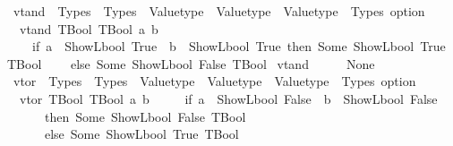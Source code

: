 \begin{isabellebody}
\isanewline
\isanewline
{}\isamarkupfalse%
\ vtand\ {\isacharcolon}{\kern0pt}{\isacharcolon}{\kern0pt}\ {\isachardoublequoteopen}Types\ {\isasymRightarrow}\ Types\ {\isasymRightarrow}\ Valuetype\ {\isasymRightarrow}\ Valuetype\ {\isasymRightarrow}\ {\isacharparenleft}{\kern0pt}Valuetype\ {\isacharasterisk}{\kern0pt}\ Types{\isacharparenright}{\kern0pt}\ option{\isachardoublequoteclose}\isanewline
{}\isanewline
\ \ {\isachardoublequoteopen}vtand\ TBool\ TBool\ a\ b\ {\isacharequal}{\kern0pt}\isanewline
\ \ \ \ {\isacharparenleft}{\kern0pt}if\ a\ {\isacharequal}{\kern0pt}\ ShowL\isactrlsub b\isactrlsub o\isactrlsub o\isactrlsub l\ True\ {\isasymand}\ b\ {\isacharequal}{\kern0pt}\ ShowL\isactrlsub b\isactrlsub o\isactrlsub o\isactrlsub l\ True\ then\ Some\ {\isacharparenleft}{\kern0pt}ShowL\isactrlsub b\isactrlsub o\isactrlsub o\isactrlsub l\ True{\isacharcomma}{\kern0pt}\ TBool{\isacharparenright}{\kern0pt}\isanewline
\ \ \ \ else\ Some\ {\isacharparenleft}{\kern0pt}ShowL\isactrlsub b\isactrlsub o\isactrlsub o\isactrlsub l\ False{\isacharcomma}{\kern0pt}\ TBool{\isacharparenright}{\kern0pt}{\isacharparenright}{\kern0pt}{\isachardoublequoteclose}\isanewline
{\isacharbar}{\kern0pt}\ {\isachardoublequoteopen}vtand\ {\isacharunderscore}{\kern0pt}\ {\isacharunderscore}{\kern0pt}\ {\isacharunderscore}{\kern0pt}\ {\isacharunderscore}{\kern0pt}\ {\isacharequal}{\kern0pt}\ None{\isachardoublequoteclose}\isanewline
\isanewline
\isanewline
{}\isamarkupfalse%
\ vtor\ {\isacharcolon}{\kern0pt}{\isacharcolon}{\kern0pt}\ {\isachardoublequoteopen}Types\ {\isasymRightarrow}\ Types\ {\isasymRightarrow}\ Valuetype\ {\isasymRightarrow}\ Valuetype\ {\isasymRightarrow}\ {\isacharparenleft}{\kern0pt}Valuetype\ {\isacharasterisk}{\kern0pt}\ Types{\isacharparenright}{\kern0pt}\ option{\isachardoublequoteclose}\isanewline
{}\isanewline
\ \ {\isachardoublequoteopen}vtor\ TBool\ TBool\ a\ b\ {\isacharequal}{\kern0pt}\isanewline
\ \ \ \ {\isacharparenleft}{\kern0pt}if\ a\ {\isacharequal}{\kern0pt}\ ShowL\isactrlsub b\isactrlsub o\isactrlsub o\isactrlsub l\ False\ {\isasymand}\ b\ {\isacharequal}{\kern0pt}\ ShowL\isactrlsub b\isactrlsub o\isactrlsub o\isactrlsub l\ False\isanewline
\ \ \ \ \ \ then\ Some\ {\isacharparenleft}{\kern0pt}ShowL\isactrlsub b\isactrlsub o\isactrlsub o\isactrlsub l\ False{\isacharcomma}{\kern0pt}\ TBool{\isacharparenright}{\kern0pt}\isanewline
\ \ \ \ \ \ else\ Some\ {\isacharparenleft}{\kern0pt}ShowL\isactrlsub b\isactrlsub o\isactrlsub o\isactrlsub l\ True{\isacharcomma}{\kern0pt}\ TBool{\isacharparenright}{\kern0pt}{\isacharparenright}{\kern0pt}{\isachardoublequoteclose}\isanewline

\end{isabellebody}
